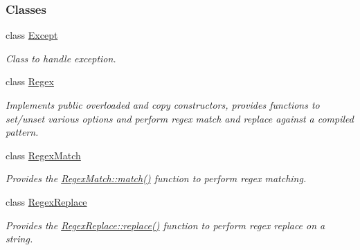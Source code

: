 \subsubsection*{Classes}
\begin{DoxyCompactItemize}
\item 
class \hyperlink{classjpcre2_1_1Except}{Except}
\begin{DoxyCompactList}\small\item\em Class to handle exception. \end{DoxyCompactList}\item 
class \hyperlink{classjpcre2_1_1Regex}{Regex}
\begin{DoxyCompactList}\small\item\em Implements public overloaded and copy constructors, provides functions to set/unset various options and perform regex match and replace against a compiled pattern. \end{DoxyCompactList}\item 
class \hyperlink{classjpcre2_1_1RegexMatch}{Regex\+Match}
\begin{DoxyCompactList}\small\item\em Provides the \hyperlink{classjpcre2_1_1RegexMatch_a5868aef3a146594ea1ebef34d122bb33_a5868aef3a146594ea1ebef34d122bb33}{Regex\+Match\+::match()} function to perform regex matching. \end{DoxyCompactList}\item 
class \hyperlink{classjpcre2_1_1RegexReplace}{Regex\+Replace}
\begin{DoxyCompactList}\small\item\em Provides the \hyperlink{classjpcre2_1_1RegexReplace_afd087fa7a9bfedec802d1a3dd7edbdd0_afd087fa7a9bfedec802d1a3dd7edbdd0}{Regex\+Replace\+::replace()} function to perform regex replace on a string. \end{DoxyCompactList}\end{DoxyCompactItemize}
